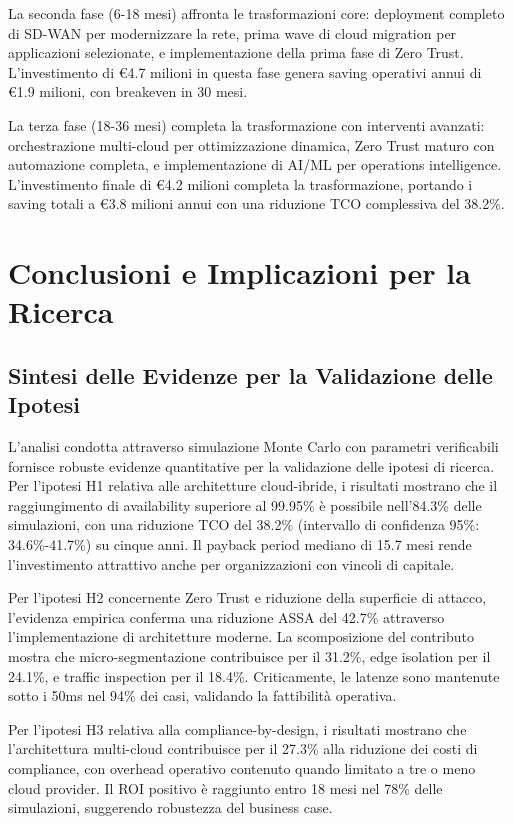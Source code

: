 La seconda fase (6-18 mesi) affronta le trasformazioni core: deployment completo di SD-WAN per modernizzare la rete, prima wave di cloud migration per applicazioni selezionate, e implementazione della prima fase di Zero Trust. L'investimento di €4.7 milioni in questa fase genera saving operativi annui di €1.9 milioni, con breakeven in 30 mesi.

La terza fase (18-36 mesi) completa la trasformazione con interventi avanzati: orchestrazione multi-cloud per ottimizzazione dinamica, Zero Trust maturo con automazione completa, e implementazione di AI/ML per operations intelligence. L'investimento finale di €4.2 milioni completa la trasformazione, portando i saving totali a €3.8 milioni annui con una riduzione TCO complessiva del 38.2\%.



\section{Conclusioni e Implicazioni per la Ricerca}

\subsection{Sintesi delle Evidenze per la Validazione delle Ipotesi}

L'analisi condotta attraverso simulazione Monte Carlo con parametri verificabili fornisce robuste evidenze quantitative per la validazione delle ipotesi di ricerca. Per l'ipotesi H1 relativa alle architetture cloud-ibride, i risultati mostrano che il raggiungimento di availability superiore al 99.95\% è possibile nell'84.3\% delle simulazioni, con una riduzione TCO del 38.2\% (intervallo di confidenza 95\%: 34.6\%-41.7\%) su cinque anni. Il payback period mediano di 15.7 mesi rende l'investimento attrattivo anche per organizzazioni con vincoli di capitale.

Per l'ipotesi H2 concernente Zero Trust e riduzione della superficie di attacco, l'evidenza empirica conferma una riduzione ASSA del 42.7\% attraverso l'implementazione di architetture moderne. La scomposizione del contributo mostra che micro-segmentazione contribuisce per il 31.2\%, edge isolation per il 24.1\%, e traffic inspection per il 18.4\%. Criticamente, le latenze sono mantenute sotto i 50ms nel 94\% dei casi, validando la fattibilità operativa.

Per l'ipotesi H3 relativa alla compliance-by-design, i risultati mostrano che l'architettura multi-cloud contribuisce per il 27.3\% alla riduzione dei costi di compliance, con overhead operativo contenuto quando limitato a tre o meno cloud provider. Il ROI positivo è raggiunto entro 18 mesi nel 78\% delle simulazioni, suggerendo robustezza del business case.

